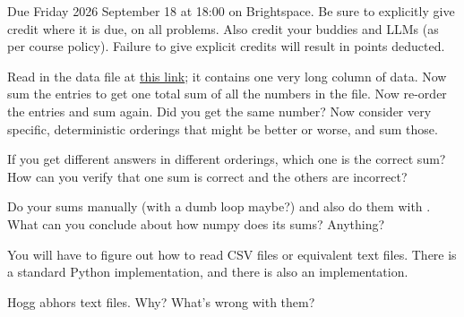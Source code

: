 \documentclass[12pt]{article}
\begin{document}
Due Friday 2026 September 18 at 18:00 on Brightspace.
Be sure to explicitly give credit where it is due, on all problems.
Also credit your buddies and LLMs (as per course policy).
Failure to give explicit credits will result in points deducted.

\begin{problem}
  \subpart Read in the data file at \href{https://drive.google.com/uc?export=download&id=1YCUGRTV5uSZeWPHa7CNXzn-YB6OC7pnm}{this link}; it contains one very long column of data.
  Now sum the entries to get one total sum of all the numbers in the file.
  Now re-order the entries and sum again. Did you get the same number?
  Now consider very specific, deterministic orderings that might be better or worse, and sum those.

  \subpart If you get different answers in different orderings, which one is the correct sum?
  How can you verify that one sum is correct and the others are incorrect?

  \subpart Do your sums manually (with a dumb  loop maybe?) and also do them with .
  What can you conclude about how numpy does its sums? Anything?
\end{problem}

\begin{note}
  You will have to figure out how to read CSV files or equivalent text files.
  There is a standard Python implementation, and there is also an  implementation.
\end{note}

\begin{note}
  Hogg abhors text files. Why? What's wrong with them?
\end{note}
\end{document}
